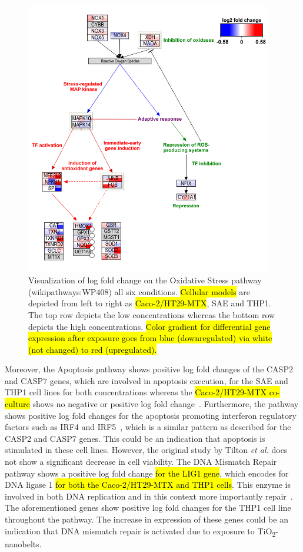 \documentclass[ijms,article,submit,moreauthors,pdftex]{Definitions/mdpi}
\begin{document}
\begin{figure}[ht!]
\includegraphics[height=12cm,keepaspectratio]{fig3.png}
  \caption{Visualization of log fold change on the Oxidative Stress pathway (wikipathways:WP408) all six conditions.
\hl{Cellular models} are depicted from left to right as \hl{Caco-2/HT29-MTX}, SAE and THP1. The top row depicts the low concentrations whereas the bottom row depicts the high concentrations. \hl{Color gradient for differential gene expression after exposure goes from blue (downregulated) via white (not changed) to red (upregulated).}}
\label{fig:fig3}
\end{figure}

Moreover, the Apoptosis pathway shows positive log fold changes of the CASP2 and CASP7 genes, which are involved in apoptosis execution, for the SAE and THP1 cell lines for both concentrations whereas the \hl{Caco-2/HT29-MTX co-culture} shows no negative or positive log fold change~\cite{BouchierHayes2011,Lamkanfi2010}. Furthermore, the pathway shows positive log fold changes for the apoptosis promoting interferon regulatory factors such as IRF4 and IRF5~\cite{Stang2007,Fanzo2003,Hu2009}, which is a similar pattern as described for the CASP2 and CASP7 genes. This could be an indication that apoptosis is stimulated in these cell lines. However, the original study by Tilton \textit{et al.} does not show a significant decrease in cell viability. 
The DNA Mismatch Repair pathway shows a positive log fold change \hl{for the LIG1 gene}, which encodes for DNA ligase 1 \hl{for both the Caco-2/HT29-MTX and THP1 cells}. This enzyme is involved in both DNA replication and in this context more importantly repair~\cite{Mota2019}. The aforementioned genes show positive log fold changes for the THP1 cell line throughout the pathway. The increase in expression of these genes could be an indication that DNA mismatch repair is activated due to exposure to TiO\textsubscript{2}-nanobelts.
\end{document}
